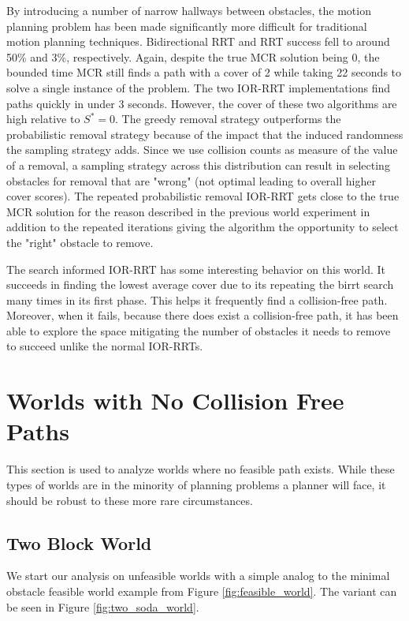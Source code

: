 By introducing a number of narrow hallways between obstacles, the motion planning problem has been made significantly more difficult for traditional motion planning techniques. Bidirectional RRT and RRT success fell to around 50\% and 3\%, respectively. Again, despite the true MCR solution being 0, the bounded time MCR still finds a path with a cover of 2 while taking 22 seconds to solve a single instance of the problem. The two IOR-RRT implementations find paths quickly in under 3 seconds. However, the cover of these two algorithms are high relative to $S^{*} = 0$. The greedy removal strategy outperforms the probabilistic removal strategy because of the impact that the induced randomness the sampling strategy adds. Since we use collision counts as measure of the value of a removal, a sampling strategy across this distribution can result in selecting obstacles for removal that are "wrong" (not optimal leading to overall higher cover scores). The repeated probabilistic removal IOR-RRT gets close to the true MCR solution for the reason described in the previous world experiment in addition to the repeated iterations giving the algorithm the opportunity to select the "right" obstacle to remove. 

The search informed IOR-RRT has some interesting behavior on this world. It succeeds in finding the lowest average cover due to its repeating the birrt search many times in its first phase. This helps it frequently find a collision-free path. Moreover, when it fails, because there does exist a collision-free path, it has been able to explore the space mitigating the number of obstacles it needs to remove to succeed unlike the normal IOR-RRTs.


\section{Worlds with No Collision Free Paths}\label{results:unfeasible}
This section is used to analyze worlds where no feasible path exists. While these types of worlds are in the minority of planning problems a planner will face, it should be robust to these more rare circumstances. 

\subsection{Two Block World}
We start our analysis on unfeasible worlds with a simple analog to the minimal obstacle feasible world example from Figure \ref{fig:feasible_world}. The variant can be seen in Figure \ref{fig:two_soda_world}.

